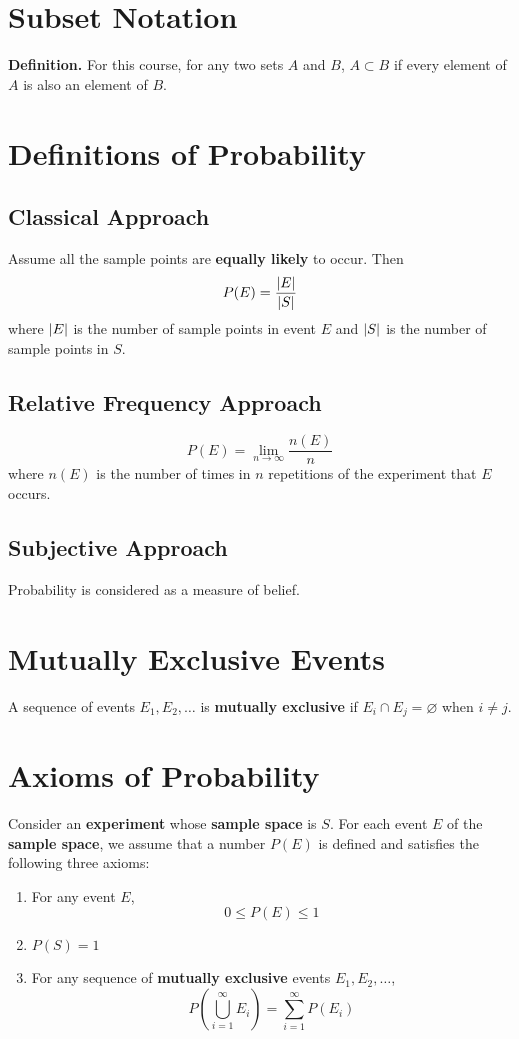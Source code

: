 \documentclass[../st2131_notes.tex]{subfiles}
\begin{document}
\section{Subset Notation}
\textbf{Definition.} For this course, for any two sets \(A\) and \(B\), \(A\subset B\) if every element of \(A\) is also an element of \(B\).

\section{Definitions of Probability}
\subsection{Classical Approach}
Assume all the sample points are \textbf{equally likely} to occur. Then
\[P(E)=\frac{\lvert E\rvert}{\lvert S\rvert}\]
where \(\lvert E\rvert\) is the number of sample points in event \(E\) and \(\lvert S\rvert\) is the number of sample points in \(S\).

\subsection{Relative Frequency Approach}
\[P(E)=\lim_{n\to\infty}\frac{n(E)}{n}\]
where \(n(E)\) is the number of times in \(n\) repetitions of the experiment that \(E\) occurs.

\subsection{Subjective Approach}
Probability is considered as a measure of belief.

\section{Mutually Exclusive Events}
A sequence of events \(E_1,E_2,\ldots\) is \textbf{mutually exclusive} if \(E_i\cap E_j=\varnothing\) when \(i\ne j\).

\section{Axioms of Probability}
Consider an \textbf{experiment} whose \textbf{sample space} is \(S\). For each event \(E\) of the \textbf{sample space}, we assume that a number \(P(E)\) is defined and satisfies the following three axioms:
\begin{enumerate}
	\item For any event \(E\),
	\[0\leq P(E)\leq 1\]
	\item \(P(S)=1\)
	\item For any sequence of \textbf{mutually exclusive} events \(E_1,E_2,\ldots\),
	\[P\left(\bigcup_{i=1}^\infty E_i\right)=\sum_{i=1}^\infty P(E_i)\]
\end{enumerate}
\end{document}
